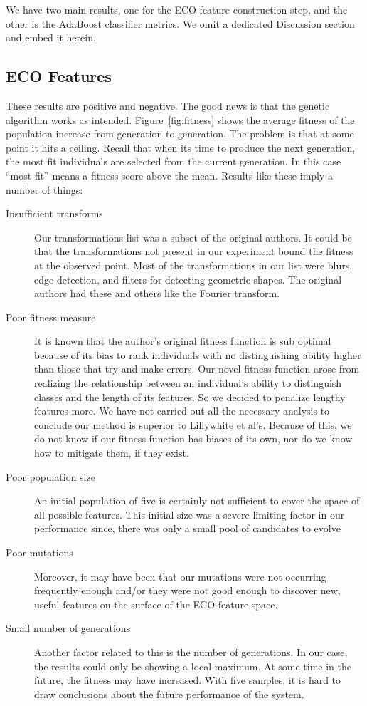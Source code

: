 \documentclass[conference]{IEEEtran}
\begin{document}
We have two main results, one for the ECO feature construction step, and the other is the AdaBoost classifier metrics. We omit a dedicated Discussion section and embed it herein.
\subsection{ECO Features}
These results are positive and negative. The good news is that the genetic algorithm works as intended. Figure~\ref{fig:fitness} shows the average fitness of the population increase from generation to generation. The problem is that at some point it hits a ceiling. Recall that when its time to produce the next generation, the most fit individuals are selected from the current generation. In this case ``most fit'' means a fitness score above the mean. Results like these imply a number of things:
\begin{description}
\item[Insufficient transforms]
  Our transformations list was a subset of the original authors. It could be that the transformations not present in our experiment bound the fitness at the observed point. Most of the transformations in our list were blurs, edge detection, and filters for detecting geometric shapes. The original authors had these and others like the Fourier transform.
\item[Poor fitness measure]
  It is known that the author's original fitness function is sub optimal because of its bias to rank individuals with no distinguishing ability higher than those that try and make errors. Our novel fitness function arose from realizing the relationship between an individual's ability to distinguish classes and the length of its features. So we decided to penalize lengthy features more. We have not carried out all the necessary analysis to conclude our method is superior to Lillywhite et al's. Because of this, we do not know if our fitness function has biases of its own, nor do we know how to mitigate them, if they exist. 
\item[Poor population size]
  An initial population of five is certainly not sufficient to cover the space of all possible features. This initial size was a severe limiting factor in our performance since, there was only a small pool of candidates to evolve
\item[Poor mutations]
  Moreover, it may have been that our mutations were not occurring frequently enough and/or they were not good enough to discover new, useful features on the surface of the ECO feature space.
\item[Small number of generations]
  Another factor related to this is the number of generations. In our case, the results could only be showing a local maximum. At some time in the future, the fitness may have increased. With five samples, it is hard to draw conclusions about the future performance of the system.
\end{description}
\end{document}
